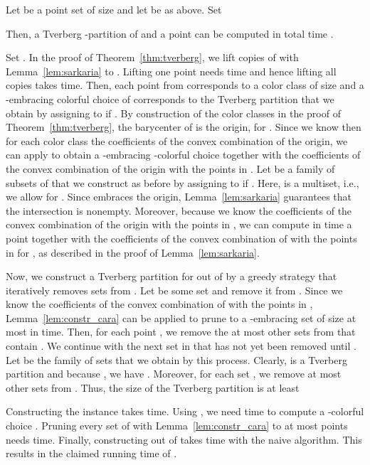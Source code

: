 \begin{corollary}\label{cor:app:tverberg}
  Let  be a point set of size  and let  
  be as above.  Set
  
  Then, a Tverberg -partition  of
   and a point  can be computed in total time .
\end{corollary}
\begin{prf}
\newcommand{\kch}[1]{\widetilde{#1}}
Set .
In the proof of Theorem~\ref{thm:tverberg},
we lift  copies of  with Lemma~\ref{lem:sarkaria} to . 
Lifting one
point needs  time and hence lifting all  copies takes
 time. Then, each point  from 
corresponds to a color class 
of size  and a -embracing colorful choice of 
corresponds to the Tverberg partition  that 
we obtain
by assigning  to  if .
By construction of the color classes in the proof of
Theorem~\ref{thm:tverberg}, the barycenter of  is the origin, for 
.
Since we know then for each color class the coefficients of the convex
combination of
the origin, we can apply  to
obtain a -embracing -colorful choice  together with the coefficients of the convex 
combination of
the origin with the points in .
Let
 be a family of
subsets of  that we construct as before by assigning  to 
 if
. Here,  is a multiset, i.e., we allow
 for . Since  embraces the origin, Lemma~\ref{lem:sarkaria}
guarantees that the intersection  is
nonempty. Moreover, because we know the coefficients of the convex 
combination of the origin with the points in , we can 
compute in  time a
point  together with the
coefficients of the convex combination of  with the points in
 for , as described in the proof of 
Lemma~\ref{lem:sarkaria}.

Now, we construct a Tverberg partition for  out of
 by a greedy strategy that iteratively
removes sets from . Let  be some set and remove it from . 
Since we know the coefficients of the convex
combination of  with the points in ,
Lemma~\ref{lem:constr_cara} can be applied to prune 
to a -embracing set of size at most  in 
 time. Then, for each point , we remove the at most  other sets from
 that contain . We continue with the next set
in  that has not yet been removed until . Let  be the family of sets that we obtain by this process.
Clearly,  is a Tverberg partition and 
because , we have .
Moreover, for each set
, we remove at most 
other sets from . Thus, the size of the Tverberg partition
 is at least


Constructing the \CCP instance takes  time.
Using , we need  time to compute a -colorful choice
. Pruning every set of  with 
Lemma~\ref{lem:constr_cara} to
at most  points needs  time.
Finally, constructing
 out of  takes  time with the naive
algorithm. This results in the claimed running time of
.
\end{prf}


